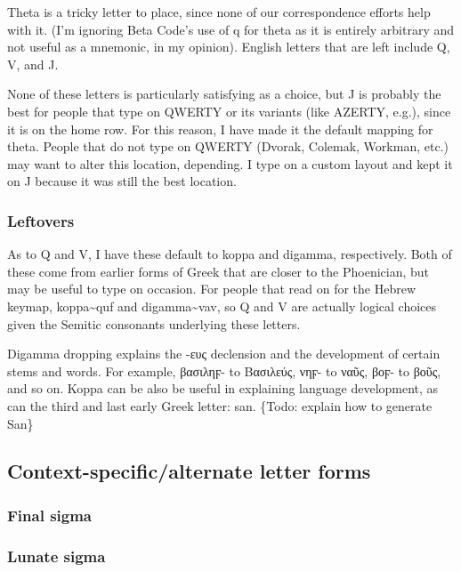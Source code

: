 \documentclass[11pt]{article}
\begin{document}
Theta is a tricky letter to place, since none of our correspondence efforts help with it. (I'm ignoring Beta Code's use of q for theta as it is entirely arbitrary and not useful as a mnemonic, in my opinion). English letters that are left include Q, V, and J.

None of these letters is particularly satisfying as a choice, but J is probably the best for people that type on QWERTY or its variants (like AZERTY, e.g.), since it is on the home row. For this reason, I have made it the default mapping for theta. People that do not type on QWERTY (Dvorak, Colemak, Workman, etc.) may want to alter this location, depending. I type on a custom layout and kept it on J because it was still the best location.

\subsubsection{Leftovers}
\label{sec:org69fa977}

As to Q and V, I have these default to koppa and digamma, respectively. Both of these come from earlier forms of Greek that are closer to the Phoenician, but may be useful to type on occasion. For people that read on for the Hebrew keymap, koppa\textasciitilde{}quf and digamma\textasciitilde{}vav, so Q and V are actually logical choices given the Semitic consonants underlying these letters.

Digamma dropping explains the -ευς declension and the development of certain stems and words. For example, βασιληϝ- to Βασιλεύς, νηϝ- to ναῦς, βοϝ- to βοῦς, and so on. Koppa can be also be useful in explaining language development, as can the third and last early Greek letter: san. \{Todo: explain how to generate San\}

\subsection{Context-specific/alternate letter forms}
\label{sec:orgf4147d6}

\subsubsection{Final sigma}
\label{sec:org02b08ed}

\subsubsection{Lunate sigma}
\label{sec:orgf3320f3}
\end{document}
